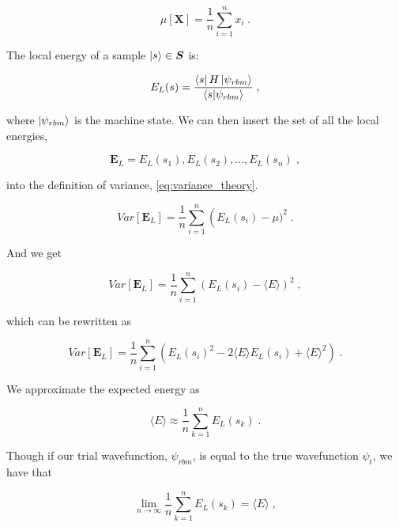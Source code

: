 \begin{equation}
  \mu[\boldsymbol{X}] = \frac{1}{n} \sum_{i=1}^n x_i \; .
  \label{eq:mean_theory}
\end{equation}

The local energy of a sample $\ket{s} \in \boldsymbol{S}$ is:

\begin{equation}
  E_L(s) = \frac{\bra{s} H \ket{\psi_{rbm}}}{\braket{s}{\psi_{rbm}}} \; ,
  \label{eq:local_energy_variance}
\end{equation}

where $\ket{\psi_{rbm}}$ is the machine state. We can then insert the set of all the local energies,

\begin{equation}
  \boldsymbol{E}_L = {E_L(s_1), E_L(s_2), \dots, E_L(s_n)} \; ,
  \label{eq:local_energies_set_variance}
\end{equation}

into the definition of variance, \ref{eq:variance_theory}.

\begin{equation}
  Var[\boldsymbol{E}_L] = \frac{1}{n} \sum_{i=1}^n \left (E_L(s_i) - \mu)^2 \; .
  \label{eq:variance_local_energy}
\end{equation}

And we get

\begin{equation}
  Var[\boldsymbol{E}_L] = \frac{1}{n} \sum_{i=1}^n \left (
    E_L(s_i)
    - \langle E \rangle
  \right )^2 \; ,
  \label{eq:variance_local_energy_2}
\end{equation}

which can be rewritten as

\begin{equation}
  Var[\boldsymbol{E}_L] = \frac{1}{n} \sum_{i=1}^n \left (E_L(s_i)^2 - 2 \langle E \rangle E_L(s_i) + \langle E \rangle^2 \right ) \; .
  \label{eq:variance_local_energy_3}
\end{equation}

We approximate the expected energy as

\begin{equation}
  \langle E \rangle \approx \frac{1}{n} \sum_{k=1}^n E_L(s_k) \; .
  \label{eq:variance_mean_energy}
\end{equation}

Though if our trial wavefunction, $\psi_{rbm}$, is equal to the true wavefunction $\psi_t$, we have that

\begin{equation}
  \lim_{n\rightarrow\infty} \frac{1}{n} \sum_{k=1}^n E_L(s_k) = \langle E \rangle \; ,
  \label{eq:variance_mean_energy_limit}
\end{equation}

